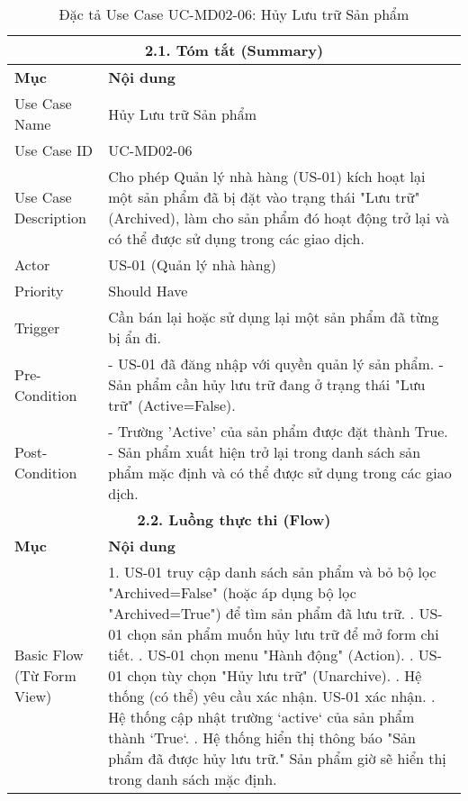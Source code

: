 \begin{longtable}{|m{4cm}|p{11cm}|}
\caption{Đặc tả Use Case UC-MD02-06: Hủy Lưu trữ Sản phẩm} \label{tab:uc_md02_06_revised} \\
\hline
\multicolumn{2}{|c|}{\textbf{2.1. Tóm tắt (Summary)}} \\
\hline
\textbf{Mục} & \textbf{Nội dung} \\
\hline
\endhead %
\hline
\endfoot %
\hline
\endlastfoot %
Use Case Name & Hủy Lưu trữ Sản phẩm \\
\hline
Use Case ID & UC-MD02-06 \\
\hline
Use Case Description & Cho phép Quản lý nhà hàng (US-01) kích hoạt lại một sản phẩm đã bị đặt vào trạng thái "Lưu trữ" (Archived), làm cho sản phẩm đó hoạt động trở lại và có thể được sử dụng trong các giao dịch. \\
\hline
Actor & US-01 (Quản lý nhà hàng) \\
\hline
Priority & Should Have \\
\hline
Trigger & Cần bán lại hoặc sử dụng lại một sản phẩm đã từng bị ẩn đi. \\
\hline
Pre-Condition & - US-01 đã đăng nhập với quyền quản lý sản phẩm. \newline - Sản phẩm cần hủy lưu trữ đang ở trạng thái "Lưu trữ" (Active=False). \\
\hline
Post-Condition & - Trường 'Active' của sản phẩm được đặt thành True. \newline - Sản phẩm xuất hiện trở lại trong danh sách sản phẩm mặc định và có thể được sử dụng trong các giao dịch. \\
\hline
\multicolumn{2}{|c|}{\textbf{2.2. Luồng thực thi (Flow)}} \\
\hline
\textbf{Mục} & \textbf{Nội dung} \\
\hline
Basic Flow (Từ Form View) & 1. US-01 truy cập danh sách sản phẩm và bỏ bộ lọc "Archived=False" (hoặc áp dụng bộ lọc "Archived=True") để tìm sản phẩm đã lưu trữ. \newline 2. US-01 chọn sản phẩm muốn hủy lưu trữ để mở form chi tiết. \newline 3. US-01 chọn menu "Hành động" (Action). \newline 4. US-01 chọn tùy chọn "Hủy lưu trữ" (Unarchive). \newline 5. Hệ thống (có thể) yêu cầu xác nhận. US-01 xác nhận. \newline 6. Hệ thống cập nhật trường `active` của sản phẩm thành `True`. \newline 7. Hệ thống hiển thị thông báo "Sản phẩm đã được hủy lưu trữ." Sản phẩm giờ sẽ hiển thị trong danh sách mặc định. \\

\end{longtable}
